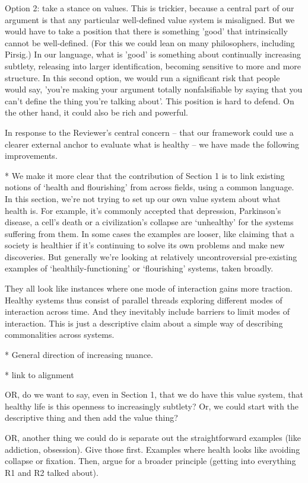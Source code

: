 \documentclass[fontsize=11.5pt]{scrartcl}
\begin{document}
Option 2: take a stance on values. This is trickier, because a central part of our argument is that any particular well-defined value system is misaligned. But we would have to take a position that there is something 'good' that intrinsically cannot be well-defined. (For this we could lean on many philosophers, including Pirsig.) In our language, what is 'good' is something about continually increasing subtlety, releasing into larger identification, becoming sensitive to more and more structure. In this second option, we would run a significant risk that people would say, 'you're making your argument totally nonfalsifiable by saying that you can't define the thing you're talking about'. This position is hard to defend. On the other hand, it could also be rich and powerful.

In response to the Reviewer's central concern -- that our framework could use a clearer external anchor to evaluate what is healthy -- we have made the following improvements. 

* We make it more clear that the contribution of Section 1 is to link existing notions of `health and flourishing' from across fields, using a common language. In this section, we're not trying to set up our own value system about what health is. For example, it's commonly accepted that depression, Parkinson's disease, a cell's death or a civilization's collapse are `unhealthy' for the systems suffering from them. In some cases the examples are looser, like claiming that a society is healthier if it's continuing to solve its own problems and make new discoveries. But generally we're looking at relatively uncontroversial pre-existing examples of `healthily-functioning' or `flourishing' systems, taken broadly. 

They all look like instances where one mode of interaction gains more traction. Healthy systems thus consist of parallel threads exploring different modes of interaction across time. And they inevitably include barriers to limit modes of interaction. This is just a descriptive claim about a simple way of describing commonalities across systems. 

* General direction of increasing nuance.

* link to alignment

OR, do we want to say, even in Section 1, that we do have this value system, that healthy life is this openness to increasingly subtlety? Or, we could start with the descriptive thing and then add the value thing?

OR, another thing we could do is separate out the straightforward examples (like addiction, obsession). Give those first. Examples where health looks like avoiding collapse or fixation. Then, argue for a broader principle (getting into everything R1 and R2 talked about).
\end{document}
